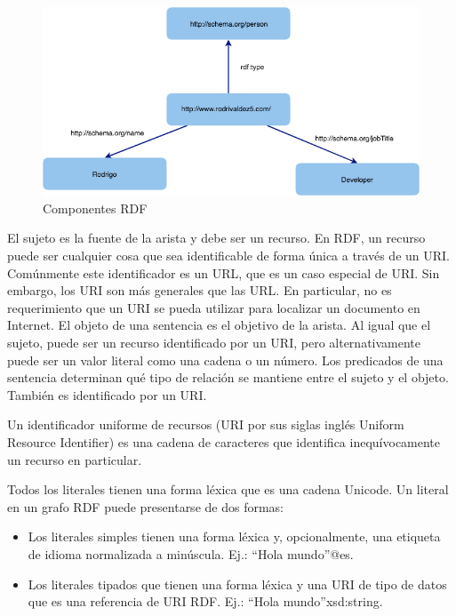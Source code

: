     \begin{figure}[h!]
    \centering
    \includegraphics[width=150mm]{figuras/Diagramas-RDFGraph}
    \caption{Componentes RDF}
    \label{img:componentes rdf }
    \end{figure}
    
El sujeto es la fuente de la arista y debe ser un recurso. En RDF, un recurso puede ser cualquier cosa que sea identificable de forma única a través de un URI. Comúnmente este identificador es un URL, que es un caso especial de URI. Sin embargo, los URI son más generales que las URL. En particular, no es requerimiento que un URI se pueda utilizar para localizar un documento en Internet. El objeto de una sentencia es el objetivo de la arista. Al igual que el sujeto, puede ser un recurso identificado por un URI, pero alternativamente puede ser un valor literal como una cadena o un número. Los predicados de una sentencia determinan qué tipo de relación se mantiene entre el sujeto y el objeto. También es identificado por un URI.

Un identificador uniforme de recursos (URI por sus siglas inglés Uniform Resource Identifier) es una cadena de caracteres que identifica inequívocamente un recurso en particular. 

Todos los literales tienen una forma léxica que es una cadena Unicode. Un literal en un grafo RDF puede presentarse de dos formas:
\begin{itemize}
    \item Los literales simples tienen una forma léxica y, opcionalmente, una etiqueta de idioma normalizada a minúscula. Ej.: “Hola mundo”@es.
    \item Los literales tipados que tienen una forma léxica y una URI de tipo de datos que es una referencia de URI RDF. Ej.: “Hola mundo”xsd:string.
\end{itemize}

